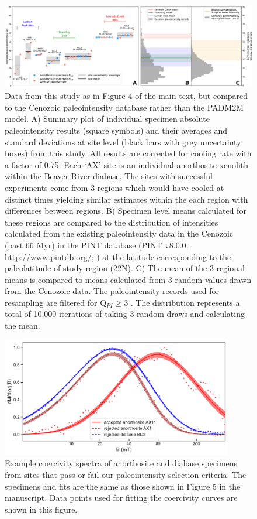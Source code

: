 \begin{figure}
\noindent\includegraphics[width=\textwidth]{figure/Zhang2022/Cenozoic_resample_SI.pdf}
\centering
\caption{\footnotesize{Data from this study as in Figure 4 of the main text, but compared to the Cenozoic paleointensity database rather than the PADM2M model. A) Summary plot of individual specimen absolute paleointensity results (square symbols) and their averages and standard deviations at site level (black bars with grey uncertainty boxes) from this study. All results are corrected for cooling rate with a factor of 0.75. Each `AX' site is an individual anorthosite xenolith within the Beaver River diabase. The sites with successful experiments come from 3 regions which would have cooled at distinct times yielding similar estimates within the each region with differences between regions. B) Specimen level means calculated for these regions are compared to the distribution of intensities calculated from the existing paleointensity data in the Cenozoic (past 66 Myr) in the PINT database (PINT v8.0.0; \url{http://www.pintdb.org/}; \citealp{Bono2022a}) at the latitude corresponding to the paleolatitude of study region (22\textdegree N). C) The mean of the 3 regional means is compared to means calculated from 3 random values drawn from the Cenozoic data. The paleointensity records used for resampling are filtered for Q$_{PI} \geq$3 \cite{Biggin2014a}. The distribution represents a total of 10,000 iterations of taking 3 random draws and calculating the mean.}}
\label{fig:Cenozoic_PINT}
\end{figure}

\clearpage

\begin{figure}
\noindent\includegraphics[width=0.9\textwidth]{figure/Zhang2022/example_unmix_plot_with_data.pdf}
\centering
\caption{\footnotesize{Example coercivity spectra of anorthosite and diabase specimens from sites that pass or fail our paleointensity selection criteria. The specimens and fits are the same as those shown in Figure 5 in the manuscript. Data points used for fitting the coercivity curves are shown in this figure. }}
\label{fig:Cenozoic_PINT}
\end{figure}

